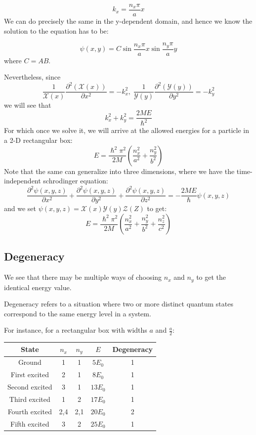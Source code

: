 \documentclass[11pt,fleqn]{book} %
\begin{document}
$$k_x=\frac{n_x\pi}{a}x$$ 
We can do precisely the same in the y-dependent domain, and hence we know the solution to the equation has to be:
\begin{proposition}
    $$\psi(x,y)=C\sin \frac{n_x\pi}{a}x\sin\frac{n_y\pi}{a}y$$ where $C=AB$.
\end{proposition}
Nevertheless, since
$$\frac{1}{\mathscr{X}(x)}\frac{\partial^2\left(\mathscr{X}(x)\right)}{\partial x^2}=-k_x^2,\;\frac{1}{\mathscr{Y}(y)}\frac{\partial^2\left(\mathscr{Y}(y)\right)}{\partial y^2}=-k_y^2$$
we will see that
$$k_x^2+k_y^2=\frac{2ME}{\hslash^2}$$
For which once we solve it, we will arrive at the allowed energies for a particle in a 2-D rectangular box:
$$E=\frac{\hslash^2\pi^2}{2M}\left(\frac{n_x^2}{a^2}+\frac{n_y^2}{b^2}\right)$$
Note that the same can generalize into three dimensions, where we have the time-independent schrodinger equation:
$$\frac{\partial^2\psi(x,y,z)}{\partial x^2}+\frac{\partial^2\psi(x,y,z)}{\partial y^2}+\frac{\partial^2\psi(x,y,z)}{\partial z^2}=-\frac{2ME}{\hslash}\psi(x,y,z)$$
and we set $\psi(x,y,z)=\mathscr{X}(x)\mathscr{Y}(y)\mathscr{Z}(Z)$ to get:
$$E=\frac{\hslash^2\pi^2}{2M}\left(\frac{n_x^2}{a^2}+\frac{n_y^2}{b^2}+\frac{n_z^2}{c^2}\right)$$
\subsection{Degeneracy}
We see that there may be multiple ways of choosing $n_x$ and $n_y$ to get the identical energy value. 
\begin{definition}[Degeneracy]
    Degeneracy refers to a situation where two or more distinct quantum states correspond to the same energy level in a system.
\end{definition}
For instance, for a rectangular box with widths $a$ and $\frac{a}{2}$:
\begin{table}[h!]
\centering
\begin{tabular}{c c c c c}
\hline\hline
State & $n_x$ & $n_y$ & $E$ & Degeneracy\\
\hline\hline
Ground & 1 & 1 & $5E_0$ & 1 \\
First excited & 2 & 1 & $8E_0$ & 1 \\
Second excited & 3 & 1 & $13E_0$ & 1 \\
Third excited & 1 & 2 & $17E_0$ & 1 \\
Fourth excited & 2,4 & 2,1 & $20E_0$ & 2 \\
Fifth excited & 3 & 2 & $25E_0$ & 1 \\
\hline
\end{tabular}
\end{table}
\end{document}
